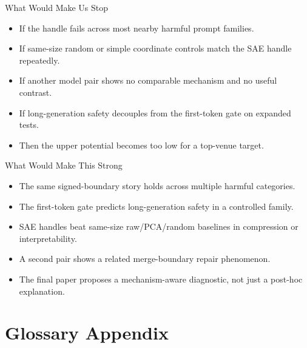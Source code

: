 \documentclass[aspectratio=169]{beamer}
\begin{document}
\begin{frame}{What Would Make Us Stop}
\small
\begin{itemize}
  \item If the handle fails across most nearby harmful prompt families.
  \item If same-size random or simple coordinate controls match the SAE handle repeatedly.
  \item If another model pair shows no comparable mechanism and no useful contrast.
  \item If long-generation safety decouples from the first-token gate on expanded tests.
  \item Then the upper potential becomes too low for a top-venue target.
\end{itemize}
\end{frame}

\begin{frame}{What Would Make This Strong}
\small
\begin{itemize}
  \item The same signed-boundary story holds across multiple harmful categories.
  \item The first-token gate predicts long-generation safety in a controlled family.
  \item SAE handles beat same-size raw/PCA/random baselines in compression or interpretability.
  \item A second pair shows a related merge-boundary repair phenomenon.
  \item The final paper proposes a mechanism-aware diagnostic, not just a post-hoc explanation.
\end{itemize}
\end{frame}

\section{Glossary Appendix}
\end{document}
